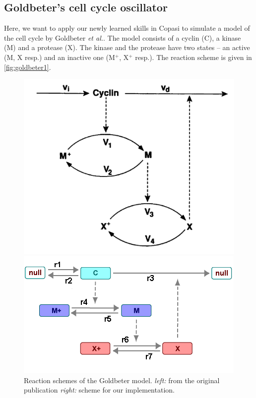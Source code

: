 \documentclass[a4paper,11pt,twoside]{article}
\begin{document}
\subsection{Goldbeter's cell cycle oscillator} 
Here, we want to apply our newly learned skills in Copasi to simulate a model of the cell cycle by Goldbeter \textit{et al.}. The model consists of a cyclin (C), a kinase (M) and a protease (X). The kinase and the protease have two states -- an active (M, X resp.) and an inactive one (M$^+$, X$^+$ resp.). The reaction scheme is given in \autoref{fig:goldbeter1}.
\begin{figure}[htb!]
\begin{minipage}{0.48\textwidth}
\centering
\includegraphics[width=\linewidth]{./Pictures/goldbeter1.pdf}
\end{minipage}
\vspace{1em}
\begin{minipage}{0.48\textwidth}
\centering
\includegraphics[width=\linewidth]{./Pictures/goldbeter_mitotic_oscillator2.png}
\end{minipage}
\caption{Reaction schemes of the Goldbeter model. \textit{left:} from the original publication \textit{right:} scheme for our implementation.}\label{fig:goldbeter1}
\end{figure}
\end{document}
